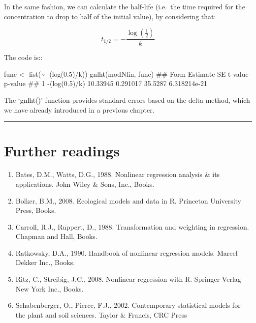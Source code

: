\documentclass[a4paper,12pt,oneside]{book}
\providecommand{\tightlist}{%
  \setlength{\itemsep}{0pt}\setlength{\parskip}{0pt}}
\newenvironment{Shaded}{\begin{snugshade}}{\end{snugshade}}
\newcommand{\FloatTok}[1]{#1}
\newcommand{\SpecialCharTok}[1]{#1}
\newcommand{\DocumentationTok}[1]{#1}
\newcommand{\OtherTok}[1]{#1}
\newcommand{\FunctionTok}[1]{#1}
\newcommand{\NormalTok}[1]{#1}
\begin{document}
In the same fashion, we can calculate the half-life (i.e.~the time required for the concentration to drop to half of the initial value), by considering that:

\[t_{1/2} = - \frac{ \log \left( {\frac{1}{2}} \right) }{k}\]

The code is::

\vspace{12pt}

\begin{Shaded}
\begin{Highlighting}[]
\NormalTok{func }\OtherTok{\textless{}{-}} \FunctionTok{list}\NormalTok{(}\SpecialCharTok{\textasciitilde{}} \SpecialCharTok{{-}}\NormalTok{(}\FunctionTok{log}\NormalTok{(}\FloatTok{0.5}\NormalTok{)}\SpecialCharTok{/}\NormalTok{k))}
\FunctionTok{gnlht}\NormalTok{(modNlin, func)}
\DocumentationTok{\#\#            Form Estimate       SE t{-}value      p{-}value}
\DocumentationTok{\#\# 1 {-}(log(0.5)/k) 10.33945 0.291017 35.5287 6.318214e{-}21}
\end{Highlighting}
\end{Shaded}

The `gnlht()' function provides standard errors based on the delta method, which we have already introduced in a previous chapter.

\begin{center}\rule{0.5\linewidth}{0.5pt}\end{center}

\hypertarget{further-readings-11}{%
\section{Further readings}\label{further-readings-11}}

\begin{enumerate}
\def\labelenumi{\arabic{enumi}.}
\tightlist
\item
  Bates, D.M., Watts, D.G., 1988. Nonlinear regression analysis \& its applications. John Wiley \& Sons, Inc., Books.
\item
  Bolker, B.M., 2008. Ecological models and data in R. Princeton University Press, Books.
\item
  Carroll, R.J., Ruppert, D., 1988. Transformation and weighting in regression. Chapman and Hall, Books.
\item
  Ratkowsky, D.A., 1990. Handbook of nonlinear regression models. Marcel Dekker Inc., Books.
\item
  Ritz, C., Streibig, J.C., 2008. Nonlinear regression with R. Springer-Verlag New York Inc., Books.
\item
  Schabenberger, O., Pierce, F.J., 2002. Contemporary statistical models for the plant and soil sciences. Taylor \& Francis, CRC Press
\end{enumerate}
\end{document}
